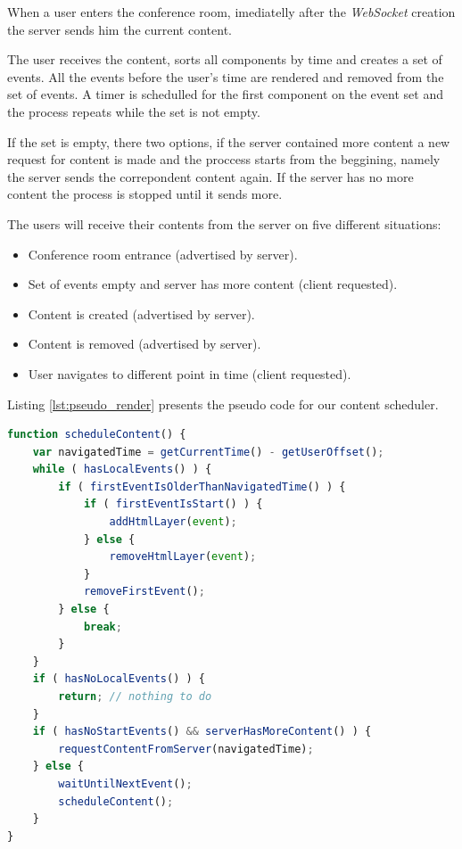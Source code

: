 	When a user enters the conference room, imediatelly after the \emph{WebSocket} creation the server sends him the current content.

	The user receives the content, sorts all components by time and creates a set of events. All the events before the user's time are rendered and removed from the set of events. A timer is schedulled for the first component on the event set and the process repeats while the set is not empty.

	If the set is empty, there two options, if the server contained more content a new request for content is made and the proccess starts from the beggining, namely the server sends the correpondent content again. If the server has no more content the process is stopped until it sends more.

	The users will receive their contents from the server on five different situations:

	\begin{itemize}
		\item Conference room entrance (advertised by server).
		\item Set of events empty and server has more content (client requested).
		\item Content is created (advertised by server).
		\item Content is removed (advertised by server).
		\item User navigates to different point in time (client requested).
	\end{itemize}



	Listing \ref{lst:pseudo_render} presents the pseudo code for our content scheduler.

\begin{minipage}[!htb]{\linewidth}
\begin{lstlisting}[caption={Pseudo code for hyper content scheduler},label={lst:pseudo_render},language=JavaScript]
function scheduleContent() {
    var navigatedTime = getCurrentTime() - getUserOffset();
    while ( hasLocalEvents() ) {
        if ( firstEventIsOlderThanNavigatedTime() ) {
            if ( firstEventIsStart() ) {
            	addHtmlLayer(event);
            } else {
            	removeHtmlLayer(event);
            }
            removeFirstEvent();
        } else {
            break;
        }
    }
    if ( hasNoLocalEvents() ) {
    	return;	// nothing to do
    } 
    if ( hasNoStartEvents() && serverHasMoreContent() ) { 
       	requestContentFromServer(navigatedTime);
    } else {
        waitUntilNextEvent();
        scheduleContent();
    }
}
\end{lstlisting}
\end{minipage}

